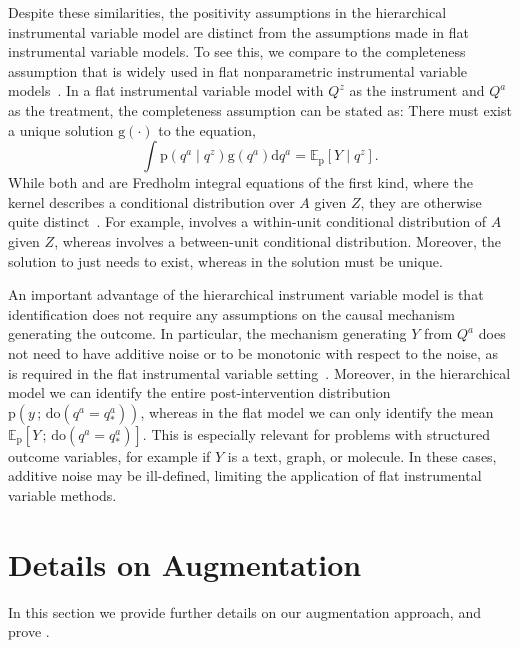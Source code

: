 \documentclass[12pt]{article}
\newcommand{\rmdo}{\mathrm{do}}
\newcommand{\s}{\, ; \,}
\newcommand{\di}{\mathrm{d}}
\newcommand{\pr}{\mathrm{p}}
\begin{document}
Despite these similarities, the positivity assumptions in the hierarchical instrumental variable model are distinct from the assumptions made in flat instrumental variable models.
To see this, we compare to the completeness assumption that is widely used in flat nonparametric instrumental variable models~\citep{Newey2003-dl}.
In a flat instrumental variable model with $Q^z$ as the instrument and $Q^a$ as the treatment, the completeness assumption can be stated as: There must exist a unique solution $\mathrm{g}(\cdot)$ to the equation,
\begin{equation} \label{eqn:flat-iv}
        \int \pr(q^{a}\mid q^{z}) \mathrm{g}(q^{a}) \di q^{a} = \mathbb{E}_\pr[Y \mid q^{z}].
\end{equation}
While both  and  are Fredholm integral equations of the first kind, where the kernel describes a conditional distribution over $A$ given $Z$, they are otherwise quite distinct~\citep{Carrasco2007-cv}.
For example,  involves a within-unit conditional distribution of $A$ given $Z$, whereas  involves a between-unit conditional distribution.
Moreover, the solution to  just needs to exist, whereas in  the solution must be unique.

An important advantage of the hierarchical instrument variable model is that identification does not require any assumptions on the causal mechanism generating the outcome.
In particular, the mechanism generating $Y$ from $Q^{a}$ does not need to have additive noise or to be monotonic with respect to the noise, as is required in the flat instrumental variable setting~\citep{Imbens2002-tk,Newey2003-dl,Saengkyongam2022-se}.
Moreover, in the hierarchical model we can identify the entire post-intervention distribution $\pr(y \s \rmdo(q^{a} = q_*^a))$, whereas in the flat model we can only identify the mean $\mathbb{E}_\pr[Y \s \rmdo(q^{a} = q_*^a)]$.
This is especially relevant for problems with structured outcome variables, for example if $Y$ is a text, graph, or molecule. In these cases, additive noise may be ill-defined, limiting the application of flat instrumental variable methods. 


\section{Details on Augmentation} \label{apx:augment_marginalize}

In this section we provide further details on our augmentation approach, and prove .
\end{document}
